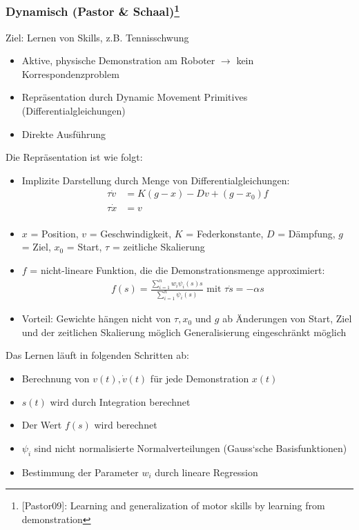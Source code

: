 \subsubsection*{Dynamisch (Pastor \& Schaal)\footnote{[Pastor09]: Learning and generalization of motor skills by learning from demonstration}}
Ziel: Lernen von Skills, z.B. Tennisschwung
\begin{itemize}
\item Aktive, physische Demonstration am Roboter $\rightarrow$ kein Korrespondenzproblem
\item Repräsentation durch Dynamic Movement Primitives (Differentialgleichungen)
\item Direkte Ausführung
\end{itemize}
Die Repräsentation ist wie folgt:
\begin{itemize}
\item Implizite Darstellung durch Menge von Differentialgleichungen:
\begin{align*}
\tau \dot{v} &= K(g-x) -Dv + (g-x_0)f\\
\tau \dot{x} &= v\\
\end{align*}
\item $x$ = Position, $v$ = Geschwindigkeit, $K$ = Federkonstante,
$D$ = Dämpfung, $g$ = Ziel, $x_0$ = Start, $\tau$ = zeitliche Skalierung
\item $f$ = nicht-lineare Funktion, die die Demonstrationsmenge approximiert:
\begin{align*}
f(s) = \frac{\sum_{i=1}^n w_i\psi_i(s)s}{\sum_{i=1}^n \psi_i(s)} \text{ mit } \tau \dot{s} = -\alpha s
\end{align*}
\item Vorteil: Gewichte hängen nicht von $\tau, x_0 $ und $g$ ab
\ita Änderungen von Start, Ziel und der zeitlichen Skalierung möglich
\ita Generalisierung eingeschränkt möglich
\end{itemize}
Das Lernen läuft in folgenden Schritten ab:
\begin{itemize}
\item Berechnung von $v(t), \dot{v}(t)$ für jede Demonstration $x(t)$
\item $s(t)$ wird durch Integration berechnet
\item Der Wert $f(s)$ wird berechnet
\item $\psi_i$ sind nicht normalisierte Normalverteilungen (\Gu Gauss‘sche Basisfunktionen\Go)
\item Bestimmung der Parameter $w_i$ durch lineare Regression
\end{itemize}
